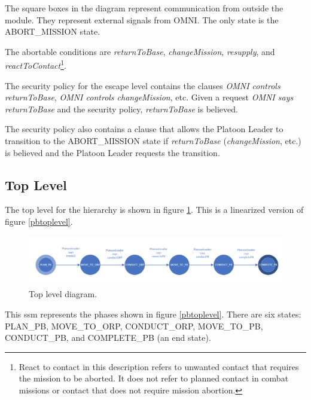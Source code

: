 \documentclass[../../main/main.tex]{subfiles}
\begin{document}
The square boxes in the diagram represent communication from outside the module.  They represent external signals from OMNI.  The only state is the ABORT_MISSION state. 

The abortable conditions are \textit{returnToBase}, \textit{changeMission}, \textit{resupply}, and \textit{reactToContact}\footnote{React to contact in this description refers to unwanted contact that requires the mission to be aborted.  It does not refer to planned contact in combat missions or contact that does not require mission abortion.}.  


The security policy for the escape level contains the clauses \textit{OMNI controls returnToBase}, \textit{OMNI controls changeMission}, etc.  Given a request \textit{OMNI says returnToBase} and the security policy, \textit{returnToBase} is believed.  

The security policy also contains a clause that allows the Platoon Leader to transition to the ABORT_MISSION state if \textit{returnToBase} (\textit{changeMission}, etc.)  is believed and the Platoon Leader requests the transition.


 \clearpage

\subsection{Top Level}\label{ssec:toplevel}
The top level for the hierarchy is shown in figure \ref{ssmPBDiagram}.  This is a linearized version of figure \ref{pbtoplevel}.

\begin{figure}[h!]
\centering
\includegraphics[width=\textwidth]{../figures/ssmPBDiagram}
\caption{\label{ssmPBDiagram} Top level diagram.}
\end{figure}

This \gls{ssm} represents the phases shown in figure \ref{pbtoplevel}.  There are six states: PLAN_PB, MOVE_TO_ORP, CONDUCT_ORP, MOVE_TO_PB, CONDUCT_PB, and COMPLETE_PB (an end state).  
\end{document}
